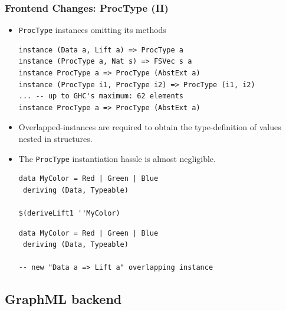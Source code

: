 \documentclass{beamer}
\begin{document}
\begin{frame}[fragile]
  \frametitle{Frontend Changes:  ProcType (II)}
  \begin{itemize}
  \item<1-> \texttt{ProcType} instances omitting its methods
\begin{lstlisting}
instance (Data a, Lift a) => ProcType a
instance (ProcType a, Nat s) => FSVec s a
instance ProcType a => ProcType (AbstExt a)
instance (ProcType i1, ProcType i2) => ProcType (i1, i2)
... -- up to GHC's maximum: 62 elements
instance ProcType a => ProcType (AbstExt a)
\end{lstlisting}
  \item<2-> Overlapped-instances are required to obtain the
    type-definition of values nested in structures.
  \item<3-> The \texttt{ProcType} instantiation hassle is almost negligible.
    \begin{overprint}
\begin{lstlisting}
data MyColor = Red | Green | Blue
 deriving (Data, Typeable)

$(deriveLift1 ''MyColor)
\end{lstlisting}
\begin{lstlisting}
data MyColor = Red | Green | Blue
 deriving (Data, Typeable)

-- new "Data a => Lift a" overlapping instance
\end{lstlisting} 
\end{overprint}     
    
  \end{itemize}
\end{frame}

\subsection{GraphML backend}
\end{document}
